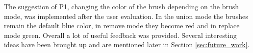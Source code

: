 The suggestion of P1, changing the color of the brush depending on the brush mode, was implemented after the user evaluation. In the union mode the brushes remain the default blue color, in remove mode they become red and in replace mode green. Overall a lot of useful feedback was provided. Several interesting ideas have been brought up and are mentioned later in Section \ref{sec:future_work}.